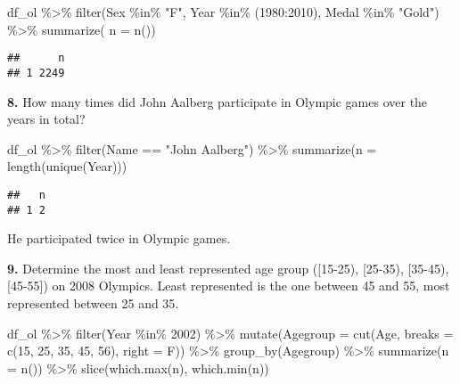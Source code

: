 \documentclass[
]{article}
\newenvironment{Shaded}{\begin{snugshade}}{\end{snugshade}}
\newcommand{\AttributeTok}[1]{\textcolor[rgb]{0.77,0.63,0.00}{#1}}
\newcommand{\DecValTok}[1]{\textcolor[rgb]{0.00,0.00,0.81}{#1}}
\newcommand{\FunctionTok}[1]{\textcolor[rgb]{0.00,0.00,0.00}{#1}}
\newcommand{\NormalTok}[1]{#1}
\newcommand{\SpecialCharTok}[1]{\textcolor[rgb]{0.00,0.00,0.00}{#1}}
\newcommand{\StringTok}[1]{\textcolor[rgb]{0.31,0.60,0.02}{#1}}
\begin{document}
\begin{Shaded}
\begin{Highlighting}[]
\NormalTok{df\_ol }\SpecialCharTok{\%\textgreater{}\%} \FunctionTok{filter}\NormalTok{(Sex }\SpecialCharTok{\%in\%} \StringTok{"F"}\NormalTok{, Year }\SpecialCharTok{\%in\%}\NormalTok{ (}\DecValTok{1980}\SpecialCharTok{:}\DecValTok{2010}\NormalTok{), Medal }\SpecialCharTok{\%in\%} \StringTok{"Gold"}\NormalTok{) }\SpecialCharTok{\%\textgreater{}\%} \FunctionTok{summarize}\NormalTok{( }\AttributeTok{n =} \FunctionTok{n}\NormalTok{()) }
\end{Highlighting}
\end{Shaded}

\begin{verbatim}
##      n
## 1 2249
\end{verbatim}

\textbf{8. }How many times did John Aalberg participate in Olympic games
over the years in total?

\begin{Shaded}
\begin{Highlighting}[]
\NormalTok{df\_ol }\SpecialCharTok{\%\textgreater{}\%} \FunctionTok{filter}\NormalTok{(Name }\SpecialCharTok{==} \StringTok{"John Aalberg"}\NormalTok{) }\SpecialCharTok{\%\textgreater{}\%} 
  \FunctionTok{summarize}\NormalTok{(}\AttributeTok{n =} \FunctionTok{length}\NormalTok{(}\FunctionTok{unique}\NormalTok{(Year)))}
\end{Highlighting}
\end{Shaded}

\begin{verbatim}
##   n
## 1 2
\end{verbatim}

He participated twice in Olympic games.

\textbf{9. }Determine the most and least represented age group
({[}15-25), {[}25-35), {[}35-45), {[}45-55{]}) on 2008 Olympics. Least
represented is the one between 45 and 55, most represented between 25
and 35.

\begin{Shaded}
\begin{Highlighting}[]
\NormalTok{df\_ol }\SpecialCharTok{\%\textgreater{}\%} \FunctionTok{filter}\NormalTok{(Year }\SpecialCharTok{\%in\%} \DecValTok{2002}\NormalTok{) }\SpecialCharTok{\%\textgreater{}\%} 
  \FunctionTok{mutate}\NormalTok{(}\AttributeTok{Agegroup =} \FunctionTok{cut}\NormalTok{(Age, }\AttributeTok{breaks =} \FunctionTok{c}\NormalTok{(}\DecValTok{15}\NormalTok{, }\DecValTok{25}\NormalTok{, }\DecValTok{35}\NormalTok{, }\DecValTok{45}\NormalTok{, }\DecValTok{56}\NormalTok{), }\AttributeTok{right =}\NormalTok{ F)) }\SpecialCharTok{\%\textgreater{}\%} 
  \FunctionTok{group\_by}\NormalTok{(Agegroup) }\SpecialCharTok{\%\textgreater{}\%} 
  \FunctionTok{summarize}\NormalTok{(}\AttributeTok{n =} \FunctionTok{n}\NormalTok{()) }\SpecialCharTok{\%\textgreater{}\%} 
  \FunctionTok{slice}\NormalTok{(}\FunctionTok{which.max}\NormalTok{(n), }\FunctionTok{which.min}\NormalTok{(n))}
\end{Highlighting}
\end{Shaded}
\end{document}
